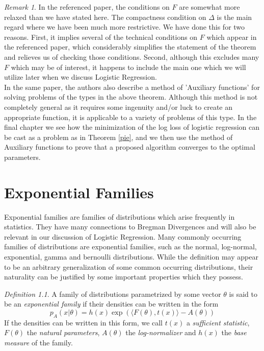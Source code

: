 \documentclass[BSc]{usydthesis}
\numberwithin{equation}{chapter}
\theoremstyle{remark}
\newtheorem{Definition}[equation]{Definition}
\newtheorem{Remark}[equation]{Remark}
\begin{document}
\begin{Remark}
 In the referenced paper, the conditions on $F$ are somewhat more relaxed than we have stated here. The compactness condition on $\Delta$ is the main regard where we have been much more restrictive. We have done this for two reasons. First, it implies several of the technical conditions on $F$ which appear in the referenced paper, which considerably simplifies the statement of the theorem and relieves us of checking those conditions. Second, although this excludes many $F$ which may be of interest, it happens to include the main one which we will utilize later when we discuss Logistic Regression.
 \\
 \newline
 In the same paper, the authors also describe a method of 'Auxiliary functions' for solving problems of the types in the above theorem. Although this method is not completely general as it requires some ingenuity and/or luck to create an appropriate function, it is applicable to a variety of problems of this type. In the final chapter we see how the minimization of the log loss of logistic regression can be cast as a problem as in Theorem \ref{pie}, and we then use the method of Auxiliary functions to prove that a proposed algorithm converges to the optimal parameters.  
\end{Remark}


\chapter{Exponential Families}

Exponential families are families of distributions which arise frequently in statistics. They have many connections to Bregman Divergences and will also be relevant in our discussion of Logistic Regression. Many commonly occurring families of distributions are exponential families, such as the normal, log-normal, exponential, gamma and bernoulli distributions. While the definition may appear to be an arbitrary generalization of some common occurring distributions, their naturality can be justified by some important properties which they possess. 

\begin{Definition}
 A family of distributions parametrized by some vector $\theta$ is said to be an {\em exponential family} if their densities can be written in the form $$p_{A}(x|\theta) = h(x) \exp( \langle F(\theta), t(x) \rangle - A(\theta))$$ If the densities can be written in this form, we call $t(x)$ a {\em sufficient statistic}, $F(\theta)$ the {\em natural parameters}, $A(\theta)$ the {\em log-normalizer} and $h(x)$ the {\em base measure} of the family. 
\end{Definition}
\end{document}
